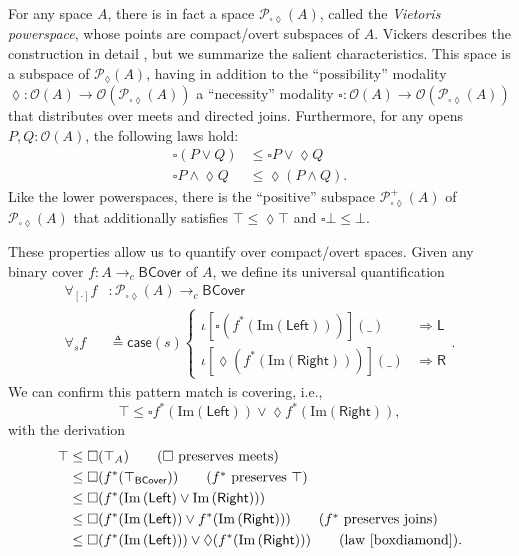 \documentclass[conference]{IEEEtran}
\newcommand{\PLower}{\mathcal{P}_\lozenge}
\newcommand{\Viet}{\mathcal{P}_{\square\lozenge}}
\newcommand{\cto}{\to_c}
\newcommand{\Open}[1]{\mathcal{O}({#1})}
\newcommand{\wildcard}{\_}
\newcommand{\Img}[1]{\text{Im}\left({#1}\right)}
\newcommand{\oinclf}[1]{\iota[{#1}]}
\newcommand{\oincl}[2]{\oinclf{#1} \left({#2}\right)}
\newcommand{\Branch}{\Rightarrow}
\newcommand{\BCover}{\mathsf{BCover}}
\newcommand{\iimg}[1]{#1^*}
\begin{document}
For any space $A$, there is in fact a space $\Viet(A)$, called the \emph{Vietoris powerspace}, whose points are compact/overt subspaces of $A$. Vickers describes the construction in detail \cite{vickersconnected, vickersdoublepowerlocale}, but we summarize the salient characteristics. This space is a subspace of $\PLower(A)$, having in addition to the ``possibility'' modality $\lozenge : \Open{A} \to \Open{\Viet(A)}$ a ``necessity'' modality $\square : \Open{A} \to \Open{\Viet(A)}$ that distributes over meets and directed joins. Furthermore, for any opens $P, Q : \Open{A}$, the following laws hold:
\begin{align}
\label{boxdiamond}
\square (P \vee Q) &\le \square P \vee \lozenge Q
\\  \square P \wedge \lozenge Q &\le \lozenge (P \wedge Q).
\end{align}
Like the lower powerspaces, there is the ``positive'' subspace $\Viet^+(A)$ of $\Viet(A)$ that additionally satisfies $\top \le \lozenge \top$ and $\square \bot \le \bot$.

These properties allow us to quantify over compact/overt spaces. Given any binary cover $f : A \cto \BCover$ of $A$, we define its universal quantification
\begin{align*}
\forall_{[\cdot]} f &: \Viet(A) \cto \BCover
\\ \forall_s f &\triangleq \mathsf{case}(s)
\begin{cases}
\oincl{\square \left( \iimg{f}(\Img{\mathsf{Left}}) \right) }{\wildcard} &\Branch \mathsf{L}
\\ \oincl{\lozenge \left( \iimg{f}(\Img{\mathsf{Right}}) \right)}{\wildcard} &\Branch \mathsf{R}
\end{cases}.
\end{align*}
We can confirm this pattern match is covering, i.e.,
\[
\top \le \square \iimg{f}(\Img{\mathsf{Left}}) \vee \lozenge \iimg{f}(\Img{\mathsf{Right}}),
\]
with the derivation
\begin{align*}
\top 
  &\le \square (\top_A) \tag{$\square$ preserves meets}
\\ &\le \square (\iimg{f}(\top_\BCover)) \tag{$\iimg{f}$ preserves $\top$}
\\ &\le \square (\iimg{f}(\Img{\mathsf{Left}} \vee \Img{\mathsf{Right}}))
\\ &\le \square(\iimg{f}(\Img{\mathsf{Left}}) \vee \iimg{f}(\Img{\mathsf{Right}}))  \tag{$\iimg{f}$ preserves joins}
\\ &\le \square (\iimg{f}(\Img{\mathsf{Left}})) \vee \lozenge (\iimg{f}(\Img{\mathsf{Right}})) \tag{law \ref{boxdiamond}}.
\end{align*}
\end{document}
